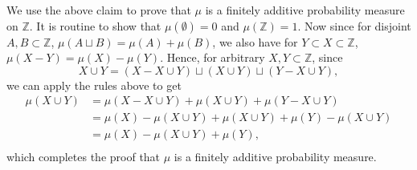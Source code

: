 \documentclass{article}
\begin{document}
\begin{enumerate}
    We use the above claim to prove that $\mu$ is a finitely additive
    probability measure on $\mathbb{Z}$. It is routine to show that
    $\mu(\emptyset)=0$ and $\mu(\mathbb{Z})=1$. Now since for disjoint
    $A,B\subset\mathbb{Z}$, $\mu(A\sqcup B)=\mu(A)+\mu(B)$, we also have
    for $Y\subset X\subset\mathbb{Z}$, $\mu(X-Y)=\mu(X)-\mu(Y)$.
    Hence, for arbitrary $X,Y\subset\mathbb{Z}$, since
    \begin{equation*}
      X\cup Y = (X-X\cup Y)\sqcup(X\cup Y)\sqcup(Y-X\cup Y),
    \end{equation*}
    we can apply the rules above to get
    \begin{align*}
      \mu(X\cup Y) &= \mu(X-X\cup Y)+\mu(X\cup Y)+\mu(Y-X\cup Y) \\
                   &= \mu(X)-\mu(X\cup Y)+\mu(X\cup Y)+\mu(Y)-\mu(X\cup Y) \\
                   &= \mu(X)-\mu(X\cup Y)+\mu(Y), \\
    \end{align*}
    which completes the proof that $\mu$ is a finitely additive probability
    measure. \\
\end{enumerate}
\end{document}
